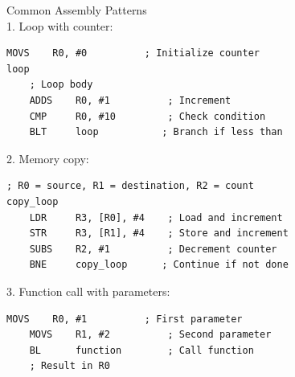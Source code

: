 \begin{KR}{Common Assembly Patterns}\\
1. Loop with counter:
\begin{lstlisting}[language=armasm, style=base]
    MOVS    R0, #0          ; Initialize counter
loop
    ; Loop body
    ADDS    R0, #1          ; Increment
    CMP     R0, #10         ; Check condition
    BLT     loop           ; Branch if less than
\end{lstlisting}

2. Memory copy:
\begin{lstlisting}[language=armasm, style=base]
    ; R0 = source, R1 = destination, R2 = count
copy_loop
    LDR     R3, [R0], #4    ; Load and increment
    STR     R3, [R1], #4    ; Store and increment
    SUBS    R2, #1          ; Decrement counter
    BNE     copy_loop      ; Continue if not done
\end{lstlisting}

3. Function call with parameters:
\begin{lstlisting}[language=armasm, style=base]
    MOVS    R0, #1          ; First parameter
    MOVS    R1, #2          ; Second parameter
    BL      function        ; Call function
    ; Result in R0
\end{lstlisting}
\end{KR}